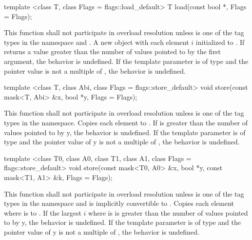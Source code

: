 \begin{itemdecl}
template <class T, class Flags = flags::load_default> T load(const bool *, Flags = Flags{});
\end{itemdecl}
\begin{itemdescr}
  \pnum\remarks This function shall not participate in overload resolution unless  is one of the tag types in the  namespace and .
  \pnum\returns A new \mask object with each element $i$ initialized to  \foralli.
  \pnum\remarks If  returns a value greater than the number of values pointed to by the first argument, the behavior is undefined.
  \pnum\remarks If the  template parameter is of type  and the pointer value is not a multiple of , the behavior is undefined.
\end{itemdescr}

\begin{itemdecl}
template <class T, class Abi, class Flags = flags::store_default>
void store(const mask<T, Abi> &x, bool *y, Flags = Flags{});
\end{itemdecl}
\begin{itemdescr}
  \pnum\remarks This function shall not participate in overload resolution unless  is one of the tag types in the  namespace.
  \pnum\effects Copies each element  to  \foralli.
  \pnum\remarks If \mask[<T, Abi>] is greater than the number of values pointed to by \code y, the behavior is undefined.
  \pnum\remarks If the  template parameter is of type  and the pointer value of \code y is not a multiple of , the behavior is undefined.
\end{itemdescr}

\begin{itemdecl}
template <class T0, class A0, class T1, class A1, class Flags = flags::store_default>
void store(const mask<T0, A0> &x, bool *y, const mask<T1, A1> &k, Flags = Flags{});
\end{itemdecl}
\begin{itemdescr}
  \pnum\remarks This function shall not participate in overload resolution unless  is one of the tag types in the  namespace and \mask[<T1, A1>] is implicitly convertible to \mask[<T0, A0>].
  \pnum\effects Copies each element  where  is \true to  \foralli.
  \pnum\remarks If the largest $i$ where  is \true is greater than the number of values pointed to by \code y, the behavior is undefined.
  \pnum\remarks If the  template parameter is of type  and the pointer value of \code y is not a multiple of , the behavior is undefined.
\end{itemdescr}

